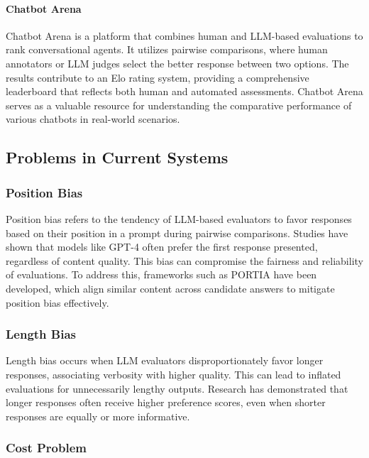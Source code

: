 \documentclass[sigconf, authoryear]{acmart}
\begin{document}
\paragraph{Chatbot Arena}


Chatbot Arena is a platform that combines human and LLM-based evaluations to rank conversational agents.
It utilizes pairwise comparisons, where human annotators or LLM judges select the better response between two options.
The results contribute to an Elo rating system, providing a comprehensive leaderboard that reflects both human and automated assessments.
Chatbot Arena serves as a valuable resource for understanding the comparative performance of various chatbots in real-world scenarios\cite{mtbench}.


\subsection{Problems in Current Systems}\label{subsec:problems-in-current-systems}

\subsubsection{Position Bias}

Position bias refers to the tendency of LLM-based evaluators to favor responses based on their position in a prompt during pairwise comparisons.
Studies have shown that models like GPT-4 often prefer the first response presented, regardless of content quality\cite{shi2024judging}.
This bias can compromise the fairness and reliability of evaluations.
To address this, frameworks such as PORTIA have been developed, which align similar content across candidate answers to mitigate position bias effectively\cite{li-etal-2024-split}.

\subsubsection{Length Bias}

Length bias occurs when LLM evaluators disproportionately favor longer responses, associating verbosity with higher quality.
This can lead to inflated evaluations for unnecessarily lengthy outputs.
Research has demonstrated that longer responses often receive higher preference scores, even when shorter responses are equally or more informative\cite{hu2024explaining}.

\subsubsection{Cost Problem}
\end{document}
